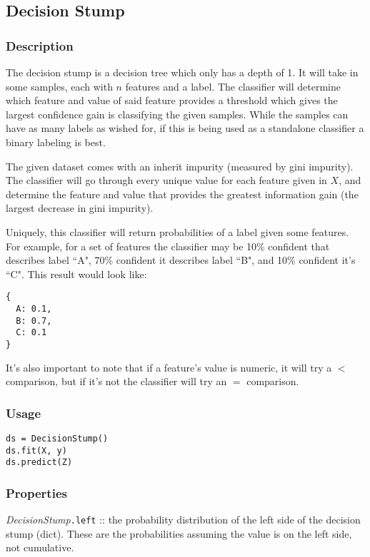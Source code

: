 \documentclass{article}
\begin{document}
\subsection{Decision Stump}

\subsubsection{Description}

The decision stump is a decision tree which only has a depth of 1.
It will take in some samples, each with $n$ features and a label.
The classifier will determine which feature and value of said feature provides a threshold which gives the largest confidence gain is classifying the given samples.
While the samples can have as many labels as wished for, if this is being used as a standalone classifier a binary labeling is best.

The given dataset comes with an inherit impurity (measured by gini impurity).
The classifier will go through every unique value for each feature given in $X$, and determine the feature and value that provides the greatest information gain (the largest decrease in gini impurity).

Uniquely, this classifier will return probabilities of a label given some features.
For example, for a set of features the classifier may be 10\% confident that describes label ``A", 70\% confident it describes label ``B", and 10\% confident it's ``C".
This result would look like:
\begin{verbatim}
{
  A: 0.1,
  B: 0.7,
  C: 0.1
}
\end{verbatim}

It's also important to note that if a feature's value is numeric, it will try a $<$ comparison, but if it's not the classifier will try an $=$ comparison.

\subsubsection{Usage}

\begin{verbatim}
ds = DecisionStump()
ds.fit(X, y)
ds.predict(Z)
\end{verbatim}

\subsubsection{Properties}

\textit{DecisionStump}\texttt{.left} :: the probability distribution of the left side of the decision stump (dict).
These are the probabilities assuming the value is on the left side, not cumulative.
\end{document}
